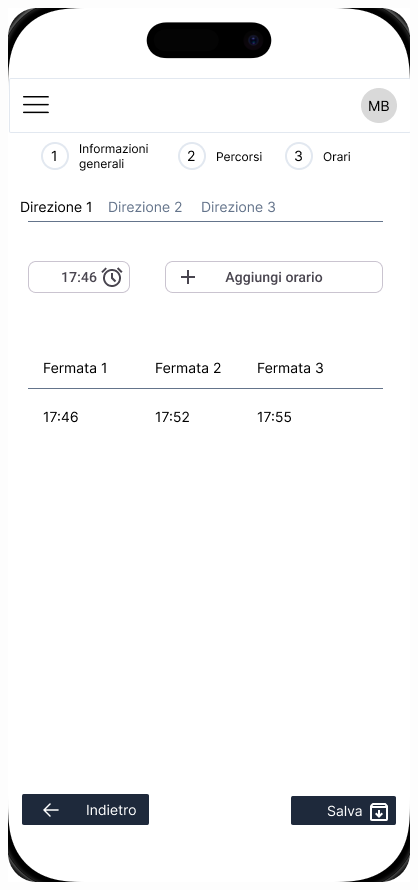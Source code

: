 \begin{figure}[H]
  \centering
  \begin{minipage}[b]{0.25\textwidth}
    \centering
    \includegraphics[width=\textwidth]{images/mockup/Creazione linea Step 3.png}

\end{minipage}
\end{figure}
